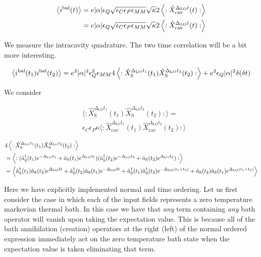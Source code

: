 \documentclass[12pt]{article}
\newcommand{\ep}{\epsilon}
\begin{document}
\begin{align}
\Braket{i^{\text{bal}}(t)} &= e|\alpha|\ep_Q \sqrt{\ep_C \ep_P \ep_{MM}} \sqrt{\kappa} 2\Braket{:\hat{X}_{\text{cav}}^{\Delta_{\text{LO}}t}(t):}\\
&= e|\alpha|\ep_Q \sqrt{\ep_C \ep_P \ep_{MM}} \sqrt{\kappa} 2\Braket{:\hat{X}_{\text{cav}}^{\Delta_{\text{LO}}t}(t):}\\
\end{align}

We measure the intracavity quadrature. The two time correlation will be a bit more interesting.

\begin{align}
\Braket{i^{\text{bal}}(t_1)i^{\text{bal}}(t_2)} = e^2 |\alpha|^2 \ep_Q^2 \ep_{MM} 4\Braket{:\hat{X}_{\text{S}}^{\Delta_{\text{LO}}t_1}(t_1)\hat{X}_{\text{S}}^{\Delta_{\text{LO}}t_2}(t_2) :} + e^2 \ep_Q |\alpha|^2 \delta(\delta t)
\end{align}

We consider

\begin{align}
&\Big\langle:\hat{X}_{\text{S}}^{\Delta_{\text{LO}}t_1}(t_1)\hat{X}_{\text{S}}^{\Delta_{\text{LO}}t_2}(t_2) :\Big\rangle =\\
& \ep_C\ep_P\kappa \Big\langle:\hat{X}_{\text{cav}}^{\Delta_{\text{LO}}t_1}(t_1)\hat{X}_{\text{cav}}^{\Delta_{\text{LO}}t_2}(t_2):\Big\rangle
\end{align}

\begin{align}
\label{eq:XXexpanded}
&4\Braket{:\hat{X}_{\text{S}}^{\Delta_{\text{LO}}t_1}(t_1)\hat{X}_{\text{S}}^{\Delta_{\text{LO}}t_2}(t_2) :}\\
&=\Braket{:(\hat{a}^{\dag}_{\text{S}}(t_1) e^{-\Delta_{\text{LO}}t_1} + \hat{a}_{\text{S}}(t_1) e^{\Delta_{\text{LO}}t_1})(\hat{a}^{\dag}_{\text{S}}(t_2) e^{-\Delta_{\text{LO}}t_2} + \hat{a}_{\text{S}}(t_2) e^{\Delta_{\text{LO}}t_2}) :}\\
&= \Braket{\hat{a}^{\dag}_{\text{S}}(t_1)\hat{a}_{\text{S}}(t_2)e^{\Delta_{\text{LO}}\delta t} + \hat{a}^{\dag}_{\text{S}}(t_2)\hat{a}_{\text{S}}(t_1)e^{-\Delta_{\text{LO}}\delta t} + \hat{a}^{\dag}_{\text{S}}(t_1)\hat{a}^{\dag}_{\text{S}}(t_2)e^{-\Delta_{\text{LO}}(t_1+t_2)} + \hat{a}_{\text{S}}(t_2)\hat{a}_{\text{S}}(t_1)e^{\Delta_{\text{LO}}(t_1+t_2)}  }
\end{align}

Here we have explicitly implemented normal and time ordering.
Let us first consider the case in which each of the input fields represents a zero temperature markovian thermal bath. In this case we have that \textit{any} term containing \textit{any} bath operator will vanish upon taking the expectation value. This is because all of the bath annihilation (creation) operators at the right (left) of the normal ordered expression immediately act on the zero temperature bath state when the expectation value is taken eliminating that term.
\end{document}

